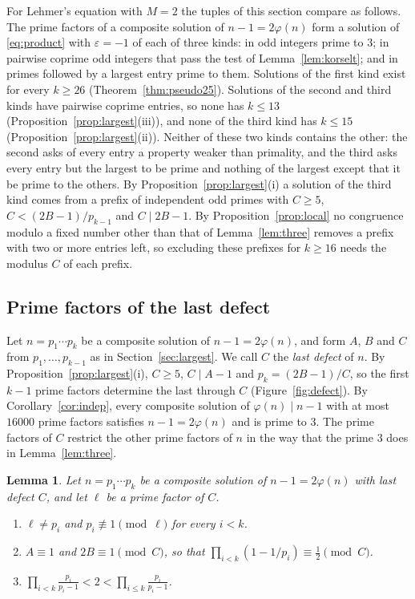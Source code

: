\documentclass[11pt,reqno]{amsart}
\numberwithin{equation}{section}
\theoremstyle{plain}
\newtheorem{lemma}[theorem]{Lemma}
\theoremstyle{definition}
\theoremstyle{remark}
\begin{document}
For Lehmer's equation with $M=2$ the tuples of this section compare
as follows. The prime factors of a composite solution of
$n-1=2\varphi(n)$ form a solution of \eqref{eq:product} with
$\varepsilon=-1$ of each of three kinds: in odd integers prime to $3$;
in pairwise coprime odd integers that pass the test of
Lemma~\ref{lem:korselt}; and in primes followed by a largest entry
prime to them. Solutions of the first kind exist for every $k\ge26$
(Theorem~\ref{thm:pseudo25}). Solutions of the second and third kinds
have pairwise coprime entries, so none has $k\le13$
(Proposition~\ref{prop:largest}(iii)), and none of the third kind has
$k\le15$ (Proposition~\ref{prop:largest}(ii)). Neither of these two
kinds contains the other: the second asks of every entry a property
weaker than primality, and the third asks every entry but the largest
to be prime and nothing of the largest except that it be prime to the
others. By Proposition~\ref{prop:largest}(i) a solution of the third
kind comes from a prefix of independent odd primes with $C\ge5$,
$C<(2B-1)/p_{k-1}$ and $C\mid2B-1$. By Proposition~\ref{prop:local} no
congruence modulo a fixed number other than that of
Lemma~\ref{lem:three} removes a prefix with two or more entries left,
so excluding these prefixes for $k\ge16$ needs the modulus $C$ of each
prefix.

\subsection{Prime factors of the last defect}\label{sec:defect}
Let $n=p_1\cdots p_k$ be a composite solution of $n-1=2\varphi(n)$, and
form $A$, $B$ and $C$ from $p_1,\dots,p_{k-1}$ as in
Section~\ref{sec:largest}. We call $C$ the \emph{last defect} of $n$.
By Proposition~\ref{prop:largest}(i), $C\ge5$, $C\mid A-1$ and
$p_k=(2B-1)/C$, so the first $k-1$ prime factors determine the last
through $C$ (Figure~\ref{fig:defect}). By Corollary~\ref{cor:indep},
every composite solution of $\varphi(n)\mid n-1$ with at most $16000$
prime factors satisfies $n-1=2\varphi(n)$ and is prime to $3$. The
prime factors of $C$ restrict the other prime factors of $n$ in the way
that the prime $3$ does in Lemma~\ref{lem:three}.

\begin{lemma}\label{lem:ell}
Let $n=p_1\cdots p_k$ be a composite solution of $n-1=2\varphi(n)$
with last defect $C$, and let $\ell$ be a prime factor of $C$.
\begin{enumerate}[label=\textup{(\roman*)}]
\item $\ell\ne p_i$ and $p_i\not\equiv1\pmod\ell$ for every $i<k$.
\item $A\equiv1$ and $2B\equiv1\pmod C$, so that
$\prod_{i<k}(1-1/p_i)\equiv\frac12\pmod C$.
\item $\displaystyle\prod_{i<k}\frac{p_i}{p_i-1}<2<\prod_{i\le k}\frac{p_i}{p_i-1}$.
\end{enumerate}
\end{lemma}
\end{document}
